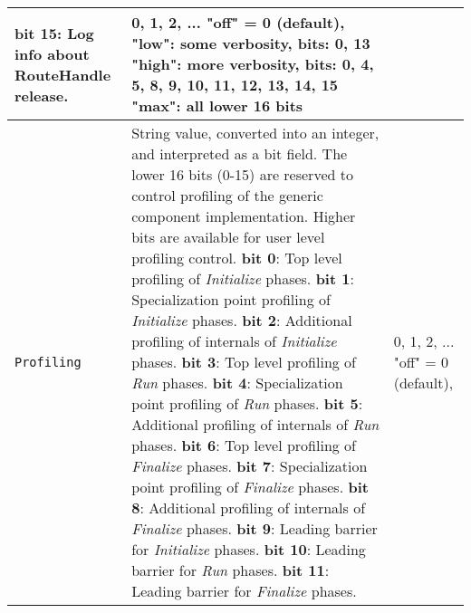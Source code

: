 \begin{longtable}{|p{}|p{}|p{}|}
                       {\bf bit 15}: Log info about RouteHandle release.
                     & 0, 1, 2, ... \newline
                       "off" = 0 (default), \newline
                       "low": some verbosity, bits: 0, 13\newline
                       "high": more verbosity, bits: 0, 4, 5, 8, 9, 10, 11, 12, 13, 14, 15\newline
                       "max": all lower 16 bits\\ \hline
     {\tt Profiling} & String value, converted into an integer, and interpreted as a bit field. The lower 16 bits (0-15) are reserved to control profiling of the generic component implementation. Higher bits are available for user level profiling control. \newline
                       {\bf bit 0}: Top level profiling of {\em Initialize} phases.\newline
                       {\bf bit 1}: Specialization point profiling of {\em Initialize} phases.\newline
                       {\bf bit 2}: Additional profiling of internals of {\em Initialize} phases.\newline
                       {\bf bit 3}: Top level profiling of {\em Run} phases.\newline
                       {\bf bit 4}: Specialization point profiling of {\em Run} phases.\newline
                       {\bf bit 5}: Additional profiling of internals of {\em Run} phases.\newline
                       {\bf bit 6}: Top level profiling of {\em Finalize} phases.\newline
                       {\bf bit 7}: Specialization point profiling of {\em Finalize} phases.\newline
                       {\bf bit 8}: Additional profiling of internals of {\em Finalize} phases.\newline
                       {\bf bit 9}: Leading barrier for {\em Initialize} phases.\newline
                       {\bf bit 10}: Leading barrier for {\em Run} phases.\newline
                       {\bf bit 11}: Leading barrier for {\em Finalize} phases.\newline
                     & 0, 1, 2, ... \newline
                       "off" = 0 (default), \newline

\end{longtable}
